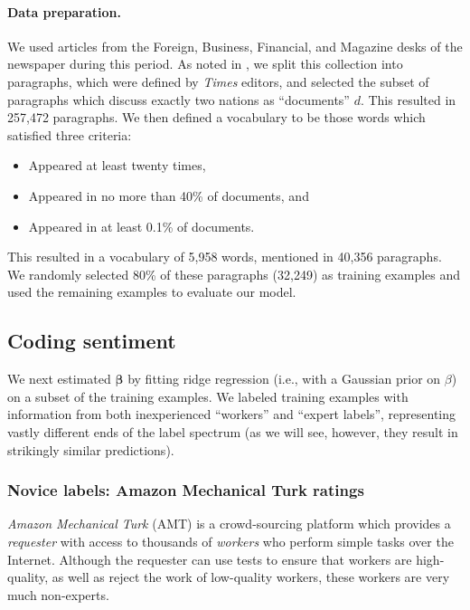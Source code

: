 \paragraph{Data preparation.}
We used articles from the Foreign, Business, Financial, and Magazine
desks of the newspaper during this period. As noted in
, we split this collection into paragraphs,
which were defined by \emph{Times} editors, and selected the subset of paragraphs
which discuss exactly two nations as ``documents'' $d$.  This resulted
in 257,472 paragraphs.  We then defined a vocabulary to be those words
which satisfied three criteria:
\begin{itemize}
  \item Appeared at least twenty times,
  \item Appeared in no more than 40\% of documents, and
  \item Appeared in at least 0.1\% of documents.
\end{itemize}
This resulted in a vocabulary of 5,958 words, mentioned in 40,356
paragraphs. We randomly selected 80\% of these paragraphs (32,249) as
training examples and used the remaining examples to evaluate our
model.

\subsection*{Coding sentiment}
\label{section:sentiment_models}

We next estimated $\bm \beta$ by fitting ridge regression (i.e.,
 with a Gaussian prior on $\beta$) on a subset
of the training examples.  We labeled training examples with
information from both inexperienced ``workers'' and ``expert labels'',
representing vastly different ends of the label spectrum (as we will
see, however, they result in strikingly similar predictions).

\subsubsection{Novice labels: Amazon Mechanical Turk ratings}
\label{section:mturk}

\emph{Amazon Mechanical Turk} (AMT) is a crowd-sourcing platform which
provides a \emph{requester} with access to
thousands of \emph{workers} who perform simple tasks over the
Internet.  Although the requester can use tests to ensure that workers
are high-quality, as well as reject the work of low-quality workers,
these workers are very much non-experts.

